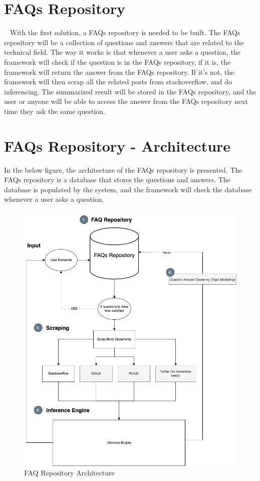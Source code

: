 \pagebreak
\section{FAQs Repository}~\label{faq-repo}
With the first solution, a FAQs repository is needed to be built. The FAQs repository will be a collection of questions and answers that are related to the technical field. The way it works is that whenever a user asks a question, the framework will check if the question is in the FAQs repository, if it is, the framework will return the answer from the FAQs repository. If it's not, the framework will then scrap all the related posts from stackoverflow, and do inferencing. The summarized result will be stored in the FAQs repository, and the user or anyone will be able to access the answer from the FAQs repository next time they ask the same question.

\section{FAQs Repository - Architecture} 
In the below figure, the architecture of the FAQs repository is presented. The FAQs repository is a database that stores the questions and answers. The database is populated by the system, and the framework will check the database whenever a user asks a question.

\pagebreak
\begin{figure}[H]
  \centering
  \noindent \includegraphics[scale=0.58]{assets/faq_repo_workflow.png}
\caption{FAQ Repository Architecture}\label{faq_repo_architecture}
\end{figure}

